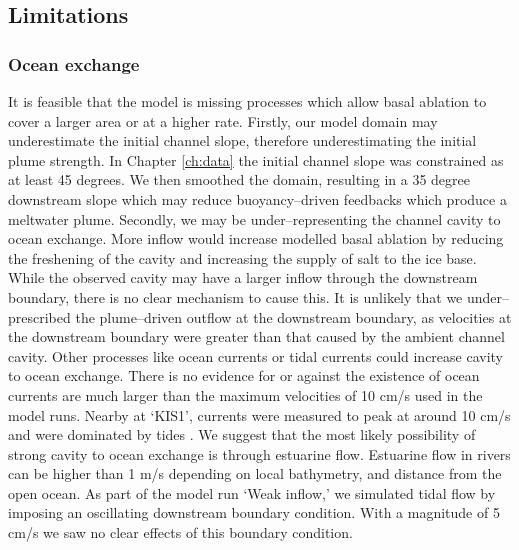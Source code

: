 \subsection{Limitations}

\subsubsection{Ocean exchange}
It is feasible that the model is missing processes which allow basal ablation to cover a larger area or at a higher rate. 
Firstly, our model domain may underestimate the initial channel slope, therefore underestimating the initial plume strength. In Chapter \ref{ch:data} the initial channel slope was constrained as at least 45 degrees. We then smoothed the domain, resulting in a 35 degree downstream slope which may reduce buoyancy--driven feedbacks which produce a meltwater plume. 
Secondly, we may be under--representing the channel cavity to ocean exchange. More inflow would increase modelled basal ablation by reducing the freshening of the cavity and increasing the supply of salt to the ice base. While the observed cavity may have a larger inflow through the downstream boundary, there is no clear  mechanism to cause this. It is unlikely that we under--prescribed the plume--driven outflow at the downstream boundary, as velocities at the downstream boundary were greater than that caused by the ambient channel cavity. Other processes like ocean currents or tidal currents could increase cavity to ocean exchange. 
There is no evidence for or against the existence of ocean currents are much larger than the maximum velocities of 10 cm/s used in the model runs. Nearby at `KIS1', currents were measured to peak at around 10 cm/s and were dominated by tides \citep{robinson2020ice}. 
We suggest that the most likely possibility of strong cavity to ocean exchange is through estuarine flow. Estuarine flow in rivers can be higher than 1 m/s \citep{nepf1996intratidal} depending on local bathymetry, and distance from the open ocean. As part of the model run `Weak inflow,' we simulated tidal flow by imposing an oscillating downstream boundary condition. With a magnitude of 5 cm/s we saw no clear effects of this boundary condition. 

